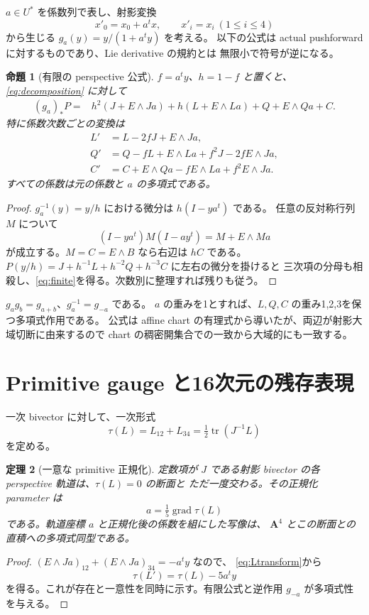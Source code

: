 \documentclass[11pt,a4paper]{ltjsarticle}
\renewcommand{\AA}{\mathbf A}
\DeclareMathOperator{\tr}{tr}
\DeclareMathOperator{\grad}{grad}
\newtheorem{theorem}{定理}[section]
\newtheorem{proposition}[theorem]{命題}
\theoremstyle{remark}
\begin{document}
$a\in U^*$ を係数列で表し、射影変換
\[
 x'_0=x_0+a^t x,\qquad x'_i=x_i\ (1\le i\le4)
\]
から生じる $g_a(y)=y/(1+a^t y)$ を考える。
以下の公式は actual pushforward に対するものであり、Lie derivative の規約とは
無限小で符号が逆になる。

\begin{proposition}[有限の perspective 公式]\label{prop:perspective}
$f=a^t y$、$h=1-f$ と置くと、\eqref{eq:decomposition} に対して
\begin{align}
 (g_a)_*P={}&h^2(J+E\wedge Ja)
       +h(L+E\wedge La)+Q+E\wedge Qa+C.\label{eq:finite}
\end{align}
特に係数次数ごとの変換は
\begin{align}
 L'&=L-2fJ+E\wedge Ja,\label{eq:Ltransform}\\
 Q'&=Q-fL+E\wedge La+f^2J-2fE\wedge Ja,\label{eq:Qtransform}\\
 C'&=C+E\wedge Qa-fE\wedge La+f^2E\wedge Ja.\label{eq:Ctransform}
\end{align}
すべての係数は元の係数と $a$ の多項式である。
\end{proposition}
\begin{proof}
$g_a^{-1}(y)=y/h$ における微分は $h(I-ya^t)$ である。
任意の反対称行列 $M$ について
\[
 (I-ya^t)M(I-ay^t)=M+E\wedge Ma
\]
が成立する。$M=C=E\wedge B$ なら右辺は $hC$ である。
$P(y/h)=J+h^{-1}L+h^{-2}Q+h^{-3}C$ に左右の微分を掛けると
三次項の分母も相殺し、\eqref{eq:finite}を得る。次数別に整理すれば残りも従う。
\end{proof}

$g_ag_b=g_{a+b}$、$g_a^{-1}=g_{-a}$ である。
$a$ の重みを1とすれば、$L,Q,C$ の重み1,2,3を保つ多項式作用である。
公式は affine chart の有理式から導いたが、両辺が射影大域切断に由来するので
chart の稠密開集合での一致から大域的にも一致する。

\section{Primitive gauge と16次元の残存表現}
一次 bivector に対して、一次形式
\[
 \tau(L)=L_{12}+L_{34}=\tfrac12\tr(J^{-1}L)
\]
を定める。
\begin{theorem}[一意な primitive 正規化]\label{thm:primitive}
定数項が $J$ である射影 bivector の各 perspective 軌道は、$\tau(L)=0$ の断面と
ただ一度交わる。その正規化 parameter は
\[
 a=\tfrac15\grad\tau(L)
\]
である。軌道座標 $a$ と正規化後の係数を組にした写像は、
$\AA^4$ とこの断面との直積への多項式同型である。
\end{theorem}
\begin{proof}
$(E\wedge Ja)_{12}+(E\wedge Ja)_{34}=-a^t y$ なので、
\eqref{eq:Ltransform}から
\[
 \tau(L')=\tau(L)-5a^t y
\]
を得る。これが存在と一意性を同時に示す。有限公式と逆作用 $g_{-a}$ が多項式性を与える。
\end{proof}
\end{document}

